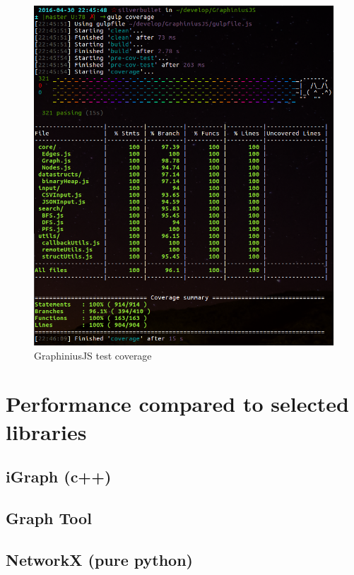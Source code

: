 \begin{figure}[ht]
	\hspace*{-0.5cm}
	\includegraphics[width=1.1\textwidth]{figures/test_coverage}
	\caption{GraphiniusJS test coverage}
	\label{fig:test_coverage}
\end{figure}


\section{Performance compared to selected libraries}
\label{sect:perf_other_libs}

	\subsection{iGraph (c++)}
	\label{ssect:perf_igraph}
	
	\subsection{Graph Tool}
	\label{ssect:perf_graphtool}
	
	\subsection{NetworkX (pure python)}
	\label{ssect:perf_networkx}
	
